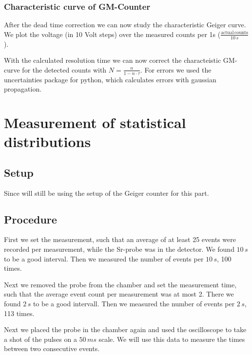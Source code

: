 \subsubsection{Characteristic curve of GM-Counter}
After the dead time correction we can now study the characteristic Geiger curve.
We plot the voltage (in 10 Volt steps) over the measured counts per 1s ($\frac{\mathrm{actual\,counts}}{10\,s}$).

With the calculated resolution time we can now correct the characteistic GM-curve for the detected counts with $N =\frac{n}{1-n\cdot\tau}$. 
For errors we used the uncertainties package for python, which calculates errors with gaussian propagation.


\section{Measurement of statistical distributions}

\subsection{Setup}

Since will still be using the setup of the Geiger counter for this part. 

\subsection{Procedure}

First we set the measurement, such that an average of at least 25 events were recorded per measurement, while the Sr-probe was in the detector. We found $10\,s$ to be a good interval. Then we measured the number of events per $10\,s$, 100 times.

Next we removed the probe from the chamber and set the measurement time, such that the average event count per measurement was at most 2. There we found $2\,s$ to be a good intervall. Then we measured the number of events per $2\,s$, 113 times.

Next we placed the probe in the chamber again and used the oscilloscope to take a shot of the pulses on a $50\,ms$ scale. We will use this data to measure the times between two consecutive events.


